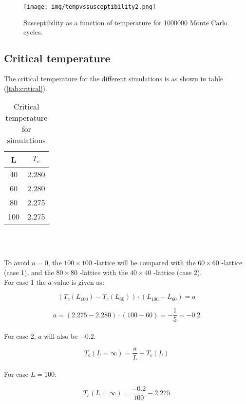 \documentclass{article}
\begin{document}
  \begin{figure}[ht]
      \centering
      \texttt{[image: img/tempvssusceptibility2.png]}
      \caption{Susceptibility as a function of temperature for 1000000 Monte Carlo cycles.}
      \label{fig:tempvssusceptibility2}
    \end{figure}


\subsection{Critical temperature} \label{sec:criticaltemperature}

  The critical temperature for the different simulations is as shown in table (\ref{tab:critical}).

    \begin{table}[ht]
      \centering
      \caption{Critical temperature for simulations}
      \vspace{2mm}
      \label{tab:critical2}
      \begin{tabular}{|c|c|}
          \hline
           L & $T_c$\\
          \hline \hline
          40 & 2.280 \\
          60 & 2.280 \\
          80 & 2.275 \\
          100 & 2.275 \\
          \hline
      \end{tabular} \\
      \hspace{0pt}\\
    \end{table}

  To avoid $a=0$, the $100 \times 100$ -lattice will be compared with the $60 \times 60$ -lattice (case 1), and the $80 \times 80$ -lattice with the $40 \times 40$ -lattice (case 2). \\

  For case 1 the $a$-value is given as:

  $$(T_c(L_{100})-T_c(L_{60}))\cdot(L_{100}-L_{60})=a$$

  $$a=(2.275-2.280)\cdot(100-60)=-\frac{1}{5}=-0.2$$ \\

  For case 2, $a$ will also be $-0.2$.

  $$T_c(L=\infty)=\frac{a}{L}-T_c(L)$$ \\

  For case $L=100$:

  $$T_c(L=\infty)=\frac{-0.2}{100}-2.275$$ \\
\end{document}
